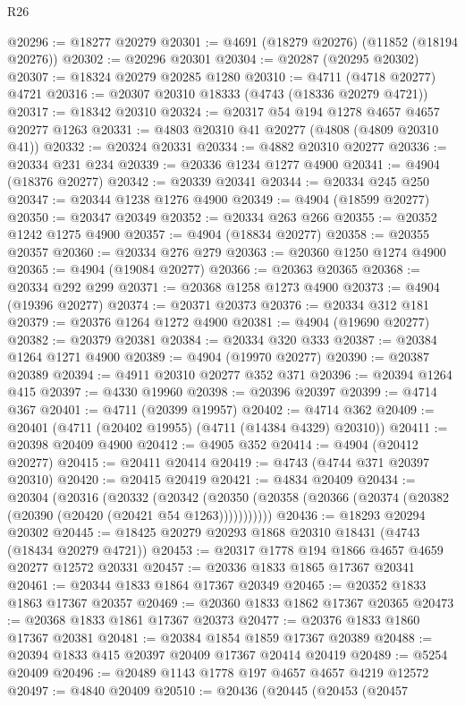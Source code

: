 \begin{lexlean}{R26}
\begin{coremodule}
@20296 := @18277 @20279
@20301 := @4691 (@18279 @20276) (@11852 (@18194 @20276))
@20302 := @20296 @20301
@20304 := @20287 (@20295 @20302)
@20307 := @18324 @20279 @20285 @1280
@20310 := @4711 (@4718 @20277) @4721
@20316 := @20307 @20310 @18333 (@4743 (@18336 @20279 @4721))
@20317 := @18342 @20310
@20324 := @20317 @54 @194 @1278 @4657 @4657 @20277 @1263
@20331 := @4803 @20310 @41 @20277 (@4808 (@4809 @20310 @41))
@20332 := @20324 @20331
@20334 := @4882 @20310 @20277
@20336 := @20334 @231 @234
@20339 := @20336 @1234 @1277 @4900
@20341 := @4904 (@18376 @20277)
@20342 := @20339 @20341
@20344 := @20334 @245 @250
@20347 := @20344 @1238 @1276 @4900
@20349 := @4904 (@18599 @20277)
@20350 := @20347 @20349
@20352 := @20334 @263 @266
@20355 := @20352 @1242 @1275 @4900
@20357 := @4904 (@18834 @20277)
@20358 := @20355 @20357
@20360 := @20334 @276 @279
@20363 := @20360 @1250 @1274 @4900
@20365 := @4904 (@19084 @20277)
@20366 := @20363 @20365
@20368 := @20334 @292 @299
@20371 := @20368 @1258 @1273 @4900
@20373 := @4904 (@19396 @20277)
@20374 := @20371 @20373
@20376 := @20334 @312 @181
@20379 := @20376 @1264 @1272 @4900
@20381 := @4904 (@19690 @20277)
@20382 := @20379 @20381
@20384 := @20334 @320 @333
@20387 := @20384 @1264 @1271 @4900
@20389 := @4904 (@19970 @20277)
@20390 := @20387 @20389
@20394 := @4911 @20310 @20277 @352 @371
@20396 := @20394 @1264 @415
@20397 := @4330 @19960
@20398 := @20396 @20397
@20399 := @4714 @367
@20401 := @4711 (@20399 @19957)
@20402 := @4714 @362
@20409 := @20401 (@4711 (@20402 @19955) (@4711 (@14384 @4329) @20310))
@20411 := @20398 @20409 @4900
@20412 := @4905 @352
@20414 := @4904 (@20412 @20277)
@20415 := @20411 @20414
@20419 := @4743 (@4744 @371 @20397 @20310)
@20420 := @20415 @20419
@20421 := @4834 @20409
@20434 := @20304
    (@20316
      (@20332
        (@20342 (@20350 (@20358 (@20366 (@20374 (@20382 (@20390 (@20420 (@20421 @54 @1263)))))))))))
@20436 := @18293 @20294 @20302
@20445 := @18425 @20279 @20293 @1868 @20310 @18431 (@4743 (@18434 @20279 @4721))
@20453 := @20317 @1778 @194 @1866 @4657 @4659 @20277 @12572 @20331
@20457 := @20336 @1833 @1865 @17367 @20341
@20461 := @20344 @1833 @1864 @17367 @20349
@20465 := @20352 @1833 @1863 @17367 @20357
@20469 := @20360 @1833 @1862 @17367 @20365
@20473 := @20368 @1833 @1861 @17367 @20373
@20477 := @20376 @1833 @1860 @17367 @20381
@20481 := @20384 @1854 @1859 @17367 @20389
@20488 := @20394 @1833 @415 @20397 @20409 @17367 @20414 @20419
@20489 := @5254 @20409
@20496 := @20489 @1143 @1778 @197 @4657 @4657 @4219 @12572
@20497 := @4840 @20409
@20510 := @20436
    (@20445
      (@20453
        (@20457

\end{coremodule}
\end{lexlean}

